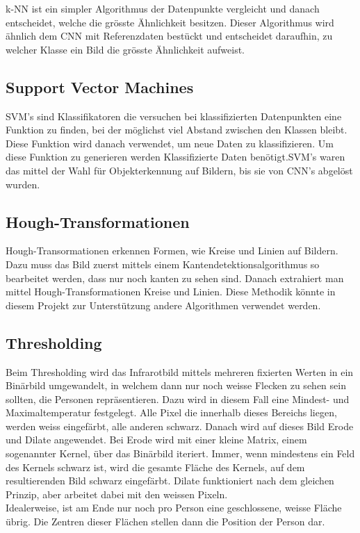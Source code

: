 \gls{k-NN} ist ein simpler Algorithmus der Datenpunkte vergleicht und danach entscheidet, welche die grösste Ähnlichkeit besitzen. Dieser Algorithmus wird ähnlich dem \gls{CNN} mit Referenzdaten bestückt und entscheidet daraufhin, zu welcher Klasse ein Bild die grösste Ähnlichkeit aufweist.

\subsection{Support Vector Machines}

\gls{SVM}'s sind Klassifikatoren die versuchen bei klassifizierten Datenpunkten eine Funktion zu finden, bei der möglichst viel Abstand zwischen den Klassen bleibt. Diese Funktion wird danach verwendet, um neue Daten zu klassifizieren. Um diese Funktion zu generieren werden Klassifizierte Daten benötigt.\gls{SVM}'s waren das mittel der Wahl für Objekterkennung auf Bildern, bis sie von \gls{CNN}'s abgelöst wurden.

\subsection{Hough-Transformationen}

Hough-Transormationen erkennen Formen, wie Kreise und Linien auf Bildern. Dazu muss das Bild zuerst mittels einem Kantendetektionsalgorithmus so bearbeitet werden, dass nur noch kanten zu sehen sind. Danach extrahiert man mittel Hough-Transformationen Kreise und Linien. Diese Methodik könnte in diesem Projekt zur Unterstützung andere Algorithmen verwendet werden.


\subsection{Thresholding}

Beim Thresholding wird das Infrarotbild mittels mehreren fixierten Werten in ein Binärbild umgewandelt, in welchem dann nur noch weisse Flecken zu sehen sein sollten, die Personen repräsentieren. Dazu wird in diesem Fall eine Mindest- und Maximaltemperatur festgelegt. Alle Pixel die innerhalb dieses Bereichs liegen, werden weiss eingefärbt, alle anderen schwarz. Danach wird auf dieses Bild \gls{Erode} und \gls{Dilate} angewendet. Bei \gls{Erode} wird mit einer kleine Matrix, einem sogenannter Kernel, über das Binärbild iteriert. Immer, wenn mindestens ein Feld des Kernels schwarz ist, wird die gesamte Fläche des Kernels, auf dem resultierenden Bild schwarz eingefärbt. \gls{Dilate} funktioniert nach dem gleichen Prinzip, aber arbeitet dabei mit den weissen Pixeln.\\
Idealerweise, ist am Ende nur noch pro Person eine geschlossene, weisse Fläche übrig. Die Zentren dieser Flächen stellen dann die Position der Person dar.


